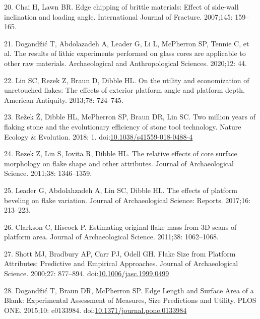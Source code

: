 \documentclass[10pt,letterpaper]{article}
\newenvironment{cslreferences}%
  {}%
  {\par}
\begin{document}
\begin{cslreferences}
\leavevmode\hypertarget{ref-chai_edge_2007}{}%
20. Chai H, Lawn BR. Edge chipping of brittle materials: Effect of
side-wall inclination and loading angle. International Journal of
Fracture. 2007;145: 159--165.

\leavevmode\hypertarget{ref-dogandzic_results_2020}{}%
21. Dogandžić T, Abdolazadeh A, Leader G, Li L, McPherron SP, Tennie C,
et al. The results of lithic experiments performed on glass cores are
applicable to other raw materials. Archaeological and Anthropological
Sciences. 2020;12: 44.

\leavevmode\hypertarget{ref-lin_utility_2013-1}{}%
22. Lin SC, Rezek Z, Braun D, Dibble HL. On the utility and
economization of unretouched flakes: The effects of exterior platform
angle and platform depth. American Antiquity. 2013;78: 724--745.

\leavevmode\hypertarget{ref-rezek_two_2018}{}%
23. Režek Ž, Dibble HL, McPherron SP, Braun DR, Lin SC. Two million
years of flaking stone and the evolutionary efficiency of stone tool
technology. Nature Ecology \& Evolution. 2018; 1.
doi:\href{https://doi.org/10.1038/s41559-018-0488-4}{10.1038/s41559-018-0488-4}

\leavevmode\hypertarget{ref-rezek_relative_2011-1}{}%
24. Rezek Z, Lin S, Iovita R, Dibble HL. The relative effects of core
surface morphology on flake shape and other attributes. Journal of
Archaeological Science. 2011;38: 1346--1359.

\leavevmode\hypertarget{ref-leader_effects_2017}{}%
25. Leader G, Abdolahzadeh A, Lin SC, Dibble HL. The effects of platform
beveling on flake variation. Journal of Archaeological Science: Reports.
2017;16: 213--223.

\leavevmode\hypertarget{ref-clarkson_estimating_2011-1}{}%
26. Clarkson C, Hiscock P. Estimating original flake mass from 3D scans
of platform area. Journal of Archaeological Science. 2011;38:
1062--1068.

\leavevmode\hypertarget{ref-shott_flake_2000}{}%
27. Shott MJ, Bradbury AP, Carr PJ, Odell GH. Flake Size from Platform
Attributes: Predictive and Empirical Approaches. Journal of
Archaeological Science. 2000;27: 877--894.
doi:\href{https://doi.org/10.1006/jasc.1999.0499}{10.1006/jasc.1999.0499}

\leavevmode\hypertarget{ref-dogandzic_edge_2015}{}%
28. Dogandžić T, Braun DR, McPherron SP. Edge Length and Surface Area of
a Blank: Experimental Assessment of Measures, Size Predictions and
Utility. PLOS ONE. 2015;10: e0133984.
doi:\href{https://doi.org/10.1371/journal.pone.0133984}{10.1371/journal.pone.0133984}


\end{cslreferences}
\end{document}
